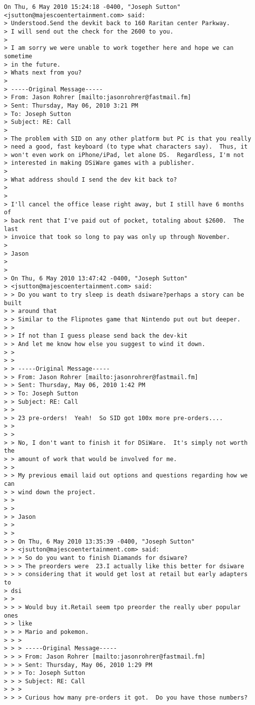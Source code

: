\documentclass[12pt]{letter}
\begin{document}
{\small
\begin{verbatim}
On Thu, 6 May 2010 15:24:18 -0400, "Joseph Sutton"
<jsutton@majescoentertainment.com> said:
> Understood.Send the devkit back to 160 Raritan center Parkway.
> I will send out the check for the 2600 to you.
>
> I am sorry we were unable to work together here and hope we can
sometime
> in the future.
> Whats next from you?
>
> -----Original Message-----
> From: Jason Rohrer [mailto:jasonrohrer@fastmail.fm]
> Sent: Thursday, May 06, 2010 3:21 PM
> To: Joseph Sutton
> Subject: RE: Call
>
> The problem with SID on any other platform but PC is that you really
> need a good, fast keyboard (to type what characters say).  Thus, it
> won't even work on iPhone/iPad, let alone DS.  Regardless, I'm not
> interested in making DSiWare games with a publisher.
>
> What address should I send the dev kit back to?
>
>
> I'll cancel the office lease right away, but I still have 6 months of
> back rent that I've paid out of pocket, totaling about $2600.  The
last
> invoice that took so long to pay was only up through November.
>
> Jason
>
>
> On Thu, 6 May 2010 13:47:42 -0400, "Joseph Sutton"
> <jsutton@majescoentertainment.com> said:
> > Do you want to try sleep is death dsiware?perhaps a story can be
built
> > around that
> > Similar to the Flipnotes game that Nintendo put out but deeper.
> >
> > If not than I guess please send back the dev-kit
> > And let me know how else you suggest to wind it down.
> >
> >
> > -----Original Message-----
> > From: Jason Rohrer [mailto:jasonrohrer@fastmail.fm]
> > Sent: Thursday, May 06, 2010 1:42 PM
> > To: Joseph Sutton
> > Subject: RE: Call
> >
> > 23 pre-orders!  Yeah!  So SID got 100x more pre-orders....
> >
> >
> > No, I don't want to finish it for DSiWare.  It's simply not worth
the
> > amount of work that would be involved for me.
> >
> > My previous email laid out options and questions regarding how we
can
> > wind down the project.
> >
> >
> > Jason
> >
> >
> > On Thu, 6 May 2010 13:35:39 -0400, "Joseph Sutton"
> > <jsutton@majescoentertainment.com> said:
> > > So do you want to finish Diamands for dsiware?
> > > The preorders were  23.I actually like this better for dsiware
> > > considering that it would get lost at retail but early adapters to
> dsi
> >
> > > Would buy it.Retail seem tpo preorder the really uber popular ones
> > like
> > > Mario and pokemon.
> > >
> > > -----Original Message-----
> > > From: Jason Rohrer [mailto:jasonrohrer@fastmail.fm]
> > > Sent: Thursday, May 06, 2010 1:29 PM
> > > To: Joseph Sutton
> > > Subject: RE: Call
> > >
> > > Curious how many pre-orders it got.  Do you have those numbers?

\end{verbatim}}
\end{document}
